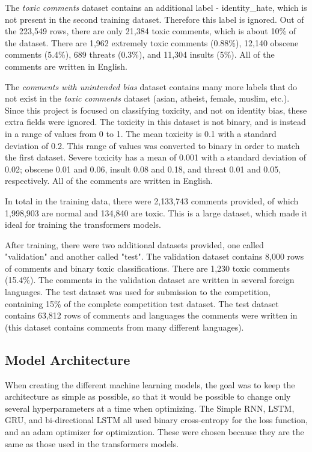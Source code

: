 \documentclass{article}
\begin{document}
The \textit{toxic comments} dataset contains an additional label - identity\_hate, which is not present in the second training dataset. Therefore this label is ignored. Out of the 223,549 rows, there are only 21,384 toxic comments, which is about 10\% of the dataset. There are 1,962 extremely toxic comments (0.88\%), 12,140 obscene comments (5.4\%), 689 threats (0.3\%), and 11,304 insults (5\%). All of the comments are written in English.

The \textit{comments with unintended bias} dataset contains many more labels that do not exist in the \textit{toxic comments} dataset (asian, atheist, female, muslim, etc.). Since this project is focused on classifying toxicity, and not on identity bias, these extra fields were ignored. The toxicity in this dataset is not binary, and is instead in a range of values from 0 to 1. The mean toxicity is 0.1 with a standard deviation of 0.2. This range of values was converted to binary in order to match the first dataset. Severe toxicity has a mean of 0.001 with a standard deviation of 0.02; obscene 0.01 and 0.06, insult 0.08 and 0.18, and threat 0.01 and 0.05, respectively. All of the comments are written in English.

In total in the training data, there were 2,133,743 comments provided, of which 1,998,903 are normal and 134,840 are toxic. This is a large dataset, which made it ideal for training the transformers models.

After training, there were two additional datasets provided, one called "validation" and another called "test". The validation dataset contains 8,000 rows of comments and binary toxic classifications. There are 1,230 toxic comments (15.4\%). The comments in the validation dataset are written in several foreign languages. The test dataset was used for submission to the competition, containing 15\% of the complete competition test dataset. The test dataset contains 63,812 rows of comments and languages the comments were written in (this dataset contains comments from many different languages).

\subsection{Model Architecture}

When creating the different machine learning models, the goal was to keep the architecture as simple as possible, so that it would be possible to change only several hyperparameters at a time when optimizing. The Simple RNN, LSTM, GRU, and bi-directional LSTM all used binary cross-entropy for the loss function, and an adam optimizer for optimization. These were chosen because they are the same as those used in the transformers models. 
\end{document}

